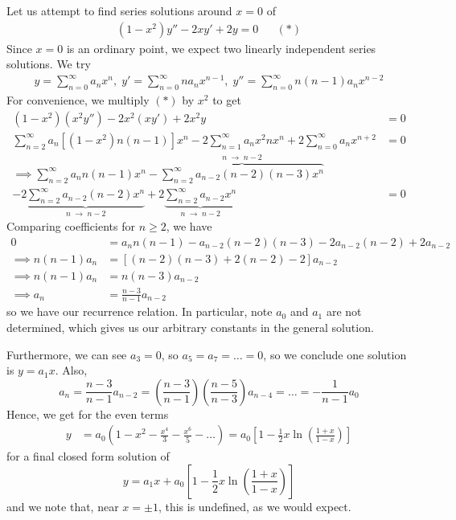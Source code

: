 \documentclass{../template/note}
\begin{document}
    \begin{example}
        Let us attempt to find series solutions around \(x=0\) of
        \begin{align*}
            (1-x^2)y'' - 2xy' + 2y = 0 && (*)
        \end{align*}
        Since \(x=0\) is an ordinary point, we expect two linearly independent series solutions. We try
        \begin{align*}
            y = \sum_{n=0}^\infty a_n x^n, \;y' = \sum_{n=0}^\infty na_n x^{n-1}, \; y'' = \sum_{n=0}^\infty n(n-1) a_n x^{n-2}
        \end{align*}
        For convenience, we multiply \((*)\) by \(x^2\) to get
        \begin{align*}
            (1-x^2)(x^2y'') -2x^2(xy') + 2x^2y &= 0 \\
            \sum_{n=2}^\infty a_n \left[(1-x^2)n(n-1)\right]x^n - 2 \sum_{n=1}^\infty a_nx^2 nx^n + 2 \sum_{n=0}^\infty a_nx^{n+2} &= 0 \\
            \implies \sum_{n=2}^\infty a_n n(n-1)x^n - \overbrace{\sum_{n=2}^\infty a_{n-2}(n-2)(n-3)x^n}^{n \;\to\; n-2} \\ - 2 \underbrace{\sum_{n=2}^\infty a_{n-2}(n-2)x^n}_{n \;\to\; n-2} + 2\underbrace{\sum_{n=2}^\infty a_{n-2}x^n}_{n \;\to\; n-2} &= 0 
        \end{align*}
        Comparing coefficients for \(n \geq 2\), we have
        \begin{align*}
            0 &= a_nn(n-1) - a_{n-2}(n-2)(n-3) - 2a_{n-2}(n-2) + 2a_{n-2} \\
            \implies n(n-1)a_n &= \left[(n-2)(n-3) + 2(n-2) - 2\right]a_{n-2} \\
            \implies n(n-1)a_n &= n(n-3)a_{n-2} \\
            \implies a_n &= \frac{n-3}{n-1} a_{n-2}
        \end{align*}
        so we have our recurrence relation. In particular, note \(a_0\) and \(a_1\) are not determined, which gives us our arbitrary constants in the general solution.

        Furthermore, we can see \(a_3 = 0\), so \(a_5 = a_7 = \dots = 0\), so we conclude one solution is \(y=a_1x\). Also,
        \[
            a_n = \frac{n-3}{n-1}a_{n-2} = \left(\frac{n-3}{n-1}\right)\left(\frac{n-5}{n-3}\right)a_{n-4} = \dots = -\frac{1}{n-1}a_0
        \]
        Hence, we get for the even terms
        \begin{align*}
            y &= a_0\left(1-x^2-\frac{x^4}{3}-\frac{x^6}{5}-\dots\right) = a_0\left[1-\frac{1}{2}x\ln\left(\frac{1+x}{1-x}\right)\right]
        \end{align*}
        for a final closed form solution of
        \[
            y = a_1x + a_0\left[1-\frac{1}{2}x\ln\left(\frac{1+x}{1-x}\right)\right]
        \]
        and we note that, near \(x = \pm 1\), this is undefined, as we would expect.
        
    \end{example}
\end{document}
